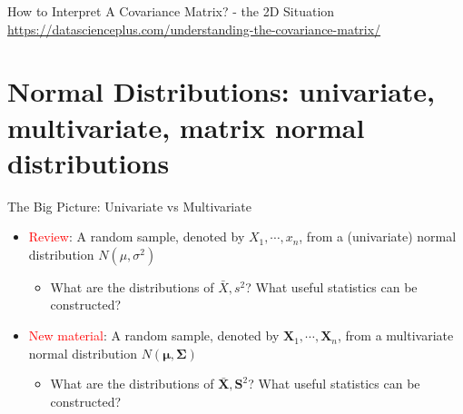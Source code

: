 \documentclass[
  ignorenonframetext,
]{beamer}
\providecommand{\tightlist}{%
  \setlength{\itemsep}{0pt}\setlength{\parskip}{0pt}}
\begin{document}
\begin{frame}{How to Interpret A Covariance Matrix? - the 2D Situation}
\protect\hypertarget{how-to-interpret-a-covariance-matrix---the-2d-situation}{}
\url{https://datascienceplus.com/understanding-the-covariance-matrix/}
\end{frame}

\hypertarget{normal-distributions-univariate-multivariate-matrix-normal-distributions}{%
\section{Normal Distributions: univariate, multivariate, matrix normal
distributions}\label{normal-distributions-univariate-multivariate-matrix-normal-distributions}}

\begin{frame}{The Big Picture: Univariate vs Multivariate}
\protect\hypertarget{the-big-picture-univariate-vs-multivariate}{}
\begin{itemize}
\tightlist
\item
  \textcolor{red}{Review}: A random sample, denoted by
  \(X_1, \cdots, x_n\), from a (univariate) normal distribution
  \(N(\mu, \sigma^2)\)

  \begin{itemize}
  \tightlist
  \item
    What are the distributions of \(\bar X, s^2\)? What useful
    statistics can be constructed?
  \end{itemize}
\item
  \textcolor{red}{New material}: A random sample, denoted by
  \(\mathbf X_1, \cdots, \mathbf X_n\), from a multivariate normal
  distribution \(N(\boldsymbol \mu, \boldsymbol \Sigma)\)

  \begin{itemize}
  \tightlist
  \item
    What are the distributions of \(\bar{\mathbf X}, \mathbf S^2\)? What
    useful statistics can be constructed?
  \end{itemize}
\end{itemize}
\end{frame}
\end{document}

